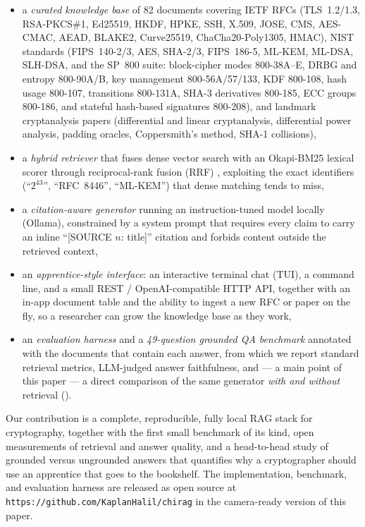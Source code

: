 \documentclass[version=submission]{iacrcc}
\begin{document}
\begin{itemize}
\item a \emph{curated knowledge base} of 82 documents covering IETF RFCs
  (TLS~1.2/1.3, RSA-PKCS\#1, Ed25519, HKDF, HPKE, SSH, X.509, JOSE, CMS,
  AES-CMAC, AEAD, BLAKE2, Curve25519, ChaCha20-Poly1305, HMAC), NIST
  standards (FIPS~140-2/3, AES, SHA-2/3, FIPS~186-5, ML-KEM, ML-DSA,
  SLH-DSA, and the SP~800 suite: block-cipher modes 800-38A--E, DRBG and
  entropy 800-90A/B, key management 800-56A/57/133, KDF 800-108, hash
  usage 800-107, transitions 800-131A, SHA-3 derivatives 800-185, ECC
  groups 800-186, and stateful hash-based signatures 800-208), and landmark
  cryptanalysis papers (differential and linear cryptanalysis, differential
  power analysis, padding oracles, Coppersmith's method, SHA-1 collisions),
\item a \emph{hybrid retriever} that fuses dense vector search with an
  Okapi-BM25 lexical scorer through reciprocal-rank fusion (RRF)
  \cite{cormack2009rrf}, exploiting the exact identifiers (``$2^{43}$'',
  ``RFC~8446'', ``ML-KEM'') that dense matching tends to miss,
\item a \emph{citation-aware generator} running an instruction-tuned model
  locally (Ollama), constrained by a system prompt that requires every claim
  to carry an inline ``[SOURCE $n$: title]'' citation and forbids content
  outside the retrieved context,
\item an \emph{apprentice-style interface}: an interactive terminal chat
  (TUI), a command line, and a small REST / OpenAI-compatible HTTP API,
  together with an in-app document table and the ability to ingest a new RFC
  or paper on the fly, so a researcher can grow the knowledge base as they
  work,
\item an \emph{evaluation harness} and a \emph{49-question grounded QA
  benchmark} annotated with the documents that contain each answer, from
  which we report standard retrieval metrics, LLM-judged answer
  faithfulness, and --- a main point of this paper --- a direct comparison
  of the same generator \emph{with and without} retrieval ().
\end{itemize}

Our contribution is a complete, reproducible, fully local RAG stack for
cryptography, together with the first small benchmark of its kind, open
measurements of retrieval and answer quality, and a head-to-head study of
grounded versus ungrounded answers that quantifies why a cryptographer
should use an apprentice that goes to the bookshelf. The implementation,
benchmark, and evaluation harness are released as open source at
\texttt{https://github.com/KaplanHalil/chirag} in the camera-ready
version of this paper.
\end{document}
